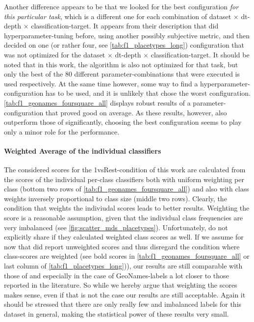 Another difference appears to be that we looked for the best configuration \textit{for this particular task}, which is a different one for each combination of dataset $\times$ \gls{dt}-depth $\times$ classification-target. It appears from their description that \mainalgos did hyperparameter-tuning before, using another possibly subjective metric, and then decided on one (or rather four, see \autoref{tab:f1_placetypes_long}) configuration that was not optimized for the dataset $\times$ \gls{dt}-depth $\times$ classification-target. It should be noted that in this work, the algorithm is also not optimized for that task, but only the best of the 80 different parameter-combinations that were executed is used respectively. At the same time however, some way to find a hyperparameter-configuration has to be used, and it is unlikely that \mainalgos chose the worst configuration. \autoref{tab:f1_geonames_foursquare_all} displays robust results of a parameter-configuration that proved good on average. As these results, however, also outperform those of \mainalgos significantly, choosing the best configuration seems to play only a minor role for the performance.

\paragraph{Weighted Average of the individual classifiers}

The considered scores for the 1vsRest-condition of this work are calculated from the scores of the individual per-class classifiers both with uniform weighting per class (bottom two rows of \autoref{tab:f1_geonames_foursquare_all}) and also with class weights inversely proportional to class size (middle two rows). Clearly, the condition that weights the indiviudal scores leads to better results. Weighting the score is a reasonable assumption, given that the individual class frequencies are very imbalanced (see \autoref{fig:scatter_mds_placetypes}). Unfortunately, \mainalgos do not explicitly share if they calculated weighted class scores as well. If we assume for now that \mainalgos did report unweighted scores and thus disregard the condition where class-scores are weighted (see bold scores in \autoref{tab:f1_geonames_foursquare_all} or last column of \autoref{tab:f1_placetypes_long})), our results are still comparable with those of \mainalgos and especially in the case of GeoNames-labels a lot closer to those reported in the literature. So while we hereby argue that weighting the scores makes sense, even if that is not the case our results are still acceptable. Again it should be stressed that there are only really few and imbalanced labels for this dataset in general, making the statistical power of these results very small.

